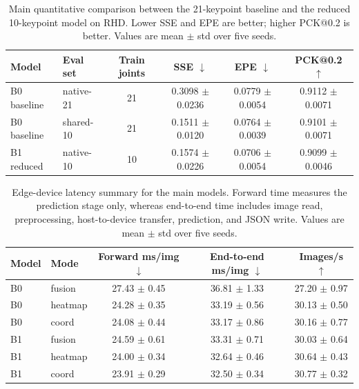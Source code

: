 \documentclass[10pt,letterpaper]{article}
\begin{document}
\begin{table}[H]
\centering
\footnotesize
\caption{Main quantitative comparison between the 21-keypoint baseline and the reduced 10-keypoint model on RHD. Lower SSE and EPE are better; higher PCK@0.2 is better. Values are mean $\pm$ std over five seeds.}
\label{tab:main_accuracy}
\begin{tabular}{llcccc}
\toprule
Model & Eval set & Train joints & SSE $\downarrow$ & EPE $\downarrow$ & PCK@0.2 $\uparrow$ \\
\midrule
B0 baseline & native-21 & 21 & 0.3098 $\pm$ 0.0236 & 0.0779 $\pm$ 0.0054 & 0.9112 $\pm$ 0.0071 \\
B0 baseline & shared-10 & 21 & 0.1511 $\pm$ 0.0120 & 0.0764 $\pm$ 0.0039 & 0.9101 $\pm$ 0.0071 \\
B1 reduced & native-10 & 10 & 0.1574 $\pm$ 0.0226 & 0.0706 $\pm$ 0.0054 & 0.9099 $\pm$ 0.0046 \\
\bottomrule
\end{tabular}
\end{table}

\begin{table}[H]
\centering
\footnotesize
\caption{Edge-device latency summary for the main models. Forward time measures the prediction stage only, whereas end-to-end time includes image read, preprocessing, host-to-device transfer, prediction, and JSON write. Values are mean $\pm$ std over five seeds.}
\label{tab:latency}
\begin{tabular}{llccc}
\toprule
Model & Mode & Forward ms/img $\downarrow$ & End-to-end ms/img $\downarrow$ & Images/s $\uparrow$ \\
\midrule
B0 & fusion & 27.43 $\pm$ 0.45 & 36.81 $\pm$ 1.33 & 27.20 $\pm$ 0.97 \\
B0 & heatmap & 24.28 $\pm$ 0.35 & 33.19 $\pm$ 0.56 & 30.13 $\pm$ 0.50 \\
B0 & coord & 24.08 $\pm$ 0.44 & 33.17 $\pm$ 0.86 & 30.16 $\pm$ 0.77 \\
B1 & fusion & 24.59 $\pm$ 0.61 & 33.31 $\pm$ 0.71 & 30.03 $\pm$ 0.64 \\
B1 & heatmap & 24.00 $\pm$ 0.34 & 32.64 $\pm$ 0.46 & 30.64 $\pm$ 0.43 \\
B1 & coord & 23.91 $\pm$ 0.29 & 32.50 $\pm$ 0.34 & 30.77 $\pm$ 0.32 \\
\bottomrule
\end{tabular}
\end{table}
\end{document}
